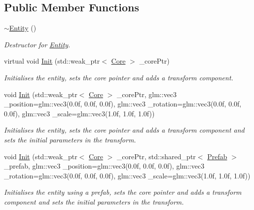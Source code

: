 \subsection*{Public Member Functions}
\begin{DoxyCompactItemize}
\item 
\hyperlink{classfrontier_1_1_entity_a56e4bc3a132b605bd8432259d8209808}{$\sim$\+Entity} ()
\begin{DoxyCompactList}\small\item\em Destructor for \hyperlink{classfrontier_1_1_entity}{Entity}. \end{DoxyCompactList}\item 
virtual void \hyperlink{classfrontier_1_1_entity_a94c998d26ccda48af3048eacd6d3c973}{Init} (std\+::weak\+\_\+ptr$<$ \hyperlink{classfrontier_1_1_core}{Core} $>$ \+\_\+core\+Ptr)
\begin{DoxyCompactList}\small\item\em Initialises the entity, sets the core pointer and adds a transform component. \end{DoxyCompactList}\item 
void \hyperlink{classfrontier_1_1_entity_ae2a5a12a0f5047bc0fbb5f7eab573213}{Init} (std\+::weak\+\_\+ptr$<$ \hyperlink{classfrontier_1_1_core}{Core} $>$ \+\_\+core\+Ptr, glm\+::vec3 \+\_\+position=glm\+::vec3(0.\+0f, 0.\+0f, 0.\+0f), glm\+::vec3 \+\_\+rotation=glm\+::vec3(0.\+0f, 0.\+0f, 0.\+0f), glm\+::vec3 \+\_\+scale=glm\+::vec3(1.\+0f, 1.\+0f, 1.\+0f))
\begin{DoxyCompactList}\small\item\em Initialises the entity, sets the core pointer and adds a transform component and sets the initial parameters in the transform. \end{DoxyCompactList}\item 
void \hyperlink{classfrontier_1_1_entity_ae7c75267698a00c70bbcf4d81a96bb9a}{Init} (std\+::weak\+\_\+ptr$<$ \hyperlink{classfrontier_1_1_core}{Core} $>$ \+\_\+core\+Ptr, std\+::shared\+\_\+ptr$<$ \hyperlink{classfrontier_1_1_prefab}{Prefab} $>$ \+\_\+prefab, glm\+::vec3 \+\_\+position=glm\+::vec3(0.\+0f, 0.\+0f, 0.\+0f), glm\+::vec3 \+\_\+rotation=glm\+::vec3(0.\+0f, 0.\+0f, 0.\+0f), glm\+::vec3 \+\_\+scale=glm\+::vec3(1.\+0f, 1.\+0f, 1.\+0f))
\begin{DoxyCompactList}\small\item\em Initialises the entity using a prefab, sets the core pointer and adds a transform component and sets the initial parameters in the transform. \end{DoxyCompactList}\item 

\end{DoxyCompactItemize}
